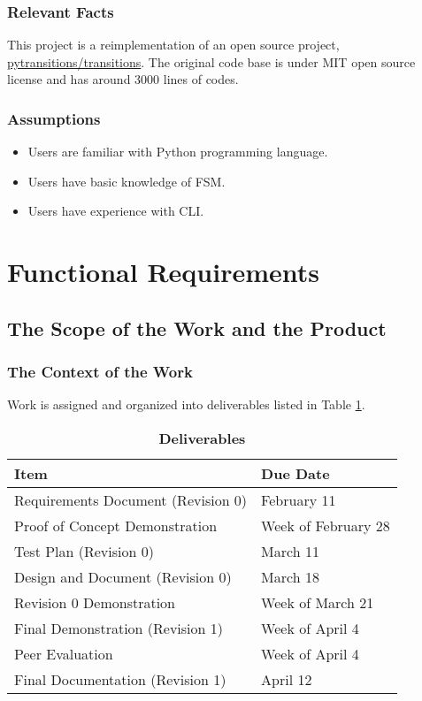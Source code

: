 \documentclass[12pt, titlepage]{article}
\begin{document}
\subsubsection{Relevant Facts}

This project is a reimplementation of an open source project,
\href{https://github.com/pytransitions/transitions/}{pytransitions/transitions}.
The original code base is under MIT open source license and has around 3000
lines of codes.

\subsubsection{Assumptions}
\begin{itemize}
\item Users are familiar with Python programming language.
\item Users have basic knowledge of FSM.
\item Users have experience with CLI.
\end{itemize}

\section{Functional Requirements}

\subsection{The Scope of the Work and the Product}

\subsubsection{The Context of the Work}

Work is assigned and organized into deliverables listed in Table \ref{tab:deliv}.

\begin{table}[H]
  \centering
  \caption{\textbf{Deliverables}}
  \begin{tabular}{ll}
    \toprule
    Item                               & Due Date \\
    \midrule
    Requirements Document (Revision 0) & February 11 \\
    Proof of Concept Demonstration     & Week of February 28 \\
    Test Plan (Revision 0)             & March 11 \\
    Design and Document (Revision 0)   & March 18 \\
    Revision 0 Demonstration           & Week of March 21 \\
    Final Demonstration (Revision 1)   & Week of April 4 \\
    Peer Evaluation                    & Week of April 4 \\
    Final Documentation (Revision 1)   & April 12 \\
    \bottomrule
  \end{tabular}
  \label{tab:deliv}
\end{table}
\end{document}
